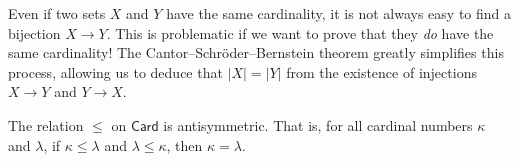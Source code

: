 Even if two sets $X$ and $Y$ have the same cardinality, it is not always easy to find a bijection $X \to Y$. This is problematic if we want to prove that they \textit{do} have the same cardinality! The Cantor--Schr\"{o}der--Bernstein theorem greatly simplifies this process, allowing us to deduce that $|X| = |Y|$ from the existence of injections $X \to Y$ and $Y \to X$.

\begin{theorem}
\label{thmCantorSchroederBernstein}
The relation $\le$ on $\mathsf{Card}$ is antisymmetric. That is, for all cardinal numbers $\kappa$ and $\lambda$, if $\kappa \le \lambda$ and $\lambda \le \kappa$, then $\kappa = \lambda$.
\end{theorem}

